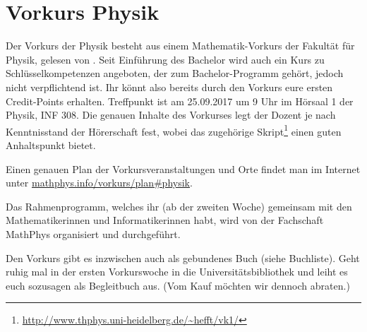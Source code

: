 \section{Vorkurs Physik}
Der Vorkurs der Physik besteht aus einem Mathematik-Vorkurs der Fakultät für Physik, gelesen von \dozentvorkurs. Seit Einführung des Bachelor wird auch ein Kurs zu Schlüsselkompetenzen angeboten, der zum Bachelor-Programm gehört, jedoch nicht verpflichtend ist. Ihr könnt also bereits durch den Vorkurs eure ersten Credit-Points erhalten. Treffpunkt ist am 25.09.2017 um 9 Uhr im Hörsaal 1 der \Gls{Physik}, \Gls{INF} 308. Die genauen Inhalte des Vorkurses legt der Dozent je nach Kenntnisstand der Hörerschaft fest, wobei das zugehörige Skript\footnote{\url{http://www.thphys.uni-heidelberg.de/~hefft/vk1/}} einen guten Anhaltspunkt bietet.

Einen genauen Plan der Vorkursveranstaltungen und Orte findet man im Internet  unter \url{mathphys.info/vorkurs/plan\#physik}.

Das Rahmenprogramm, welches ihr (ab der zweiten Woche) gemeinsam mit den Mathematikerinnen und Informatikerinnen habt, wird von der Fachschaft MathPhys organisiert und durchgeführt.

Den Vorkurs gibt es inzwischen auch als gebundenes Buch (siehe Buchliste). Geht ruhig mal in der ersten Vorkurswoche in die Universitätsbibliothek und leiht es euch sozusagen als Begleitbuch aus. (Vom Kauf möchten wir dennoch abraten.)
